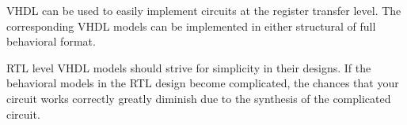 \begin{my_list}
\item VHDL can be used to easily implement circuits at the register transfer level. The corresponding VHDL models can be implemented in either structural of full behavioral format. 

\item RTL level VHDL models should strive for simplicity in their designs. If the behavioral models in the RTL design become complicated, the chances that your circuit works correctly greatly diminish due to the synthesis of the complicated circuit. 
\end{my_list}




